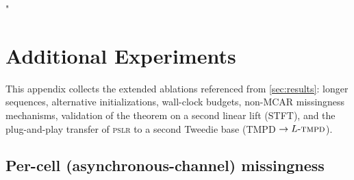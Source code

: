 "\documentclass{article}
\theoremstyle{plain}
\theoremstyle{definition}
\theoremstyle{remark}
\newcommand{\pslr}{\textsc{pslr}}
\newcommand{\ltmpd}{L\mbox{-}\textsc{tmpd}}
\begin{document}
\begin{table}[h]
\centering
\caption{Architectural hyperparameters at sequence length $768$.}
\label{tab:hp_seq_768}
\setlength{\tabcolsep}{4pt}
\end{table}


\section{Additional Experiments}
\label{app:additional-exp}

This appendix collects the extended ablations referenced from \cref{sec:results}: longer sequences, alternative initializations, wall-clock budgets, non-MCAR missingness mechanisms, validation of the theorem on a second linear lift (STFT), and the plug-and-play transfer of \pslr{} to a second Tweedie base (TMPD $\to \ltmpd$).

\subsection{Per-cell (asynchronous-channel) missingness}
\label{app:cell-random}
\end{document}
